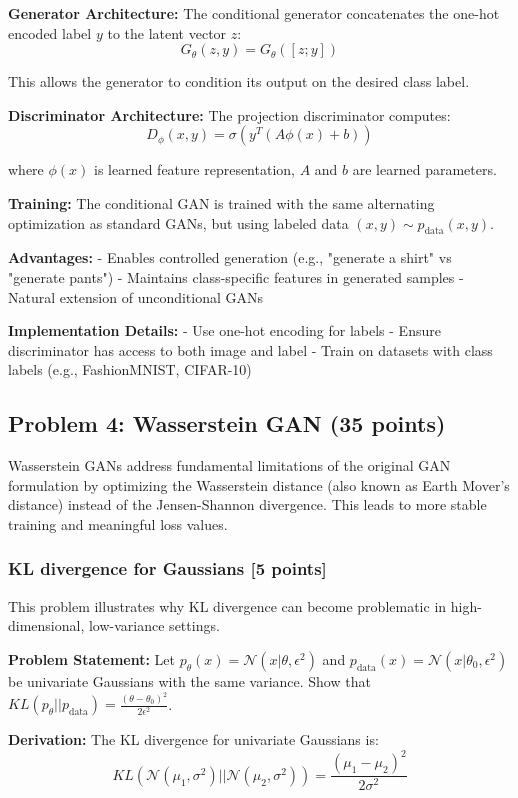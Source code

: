 \documentclass{article}
\begin{document}
\textbf{Generator Architecture:} The conditional generator concatenates the one-hot encoded label $y$ to the latent vector $z$:
\[
G_\theta(z, y) = G_\theta([z; y])
\]

This allows the generator to condition its output on the desired class label.

\textbf{Discriminator Architecture:} The projection discriminator computes:
\[
D_\phi(x, y) = \sigma(y^T (A \phi(x) + b))
\]

where $\phi(x)$ is learned feature representation, $A$ and $b$ are learned parameters.

\textbf{Training:} The conditional GAN is trained with the same alternating optimization as standard GANs, but using labeled data $(x, y) \sim p_{\text{data}}(x, y)$.

\textbf{Advantages:}
- Enables controlled generation (e.g., "generate a shirt" vs "generate pants")
- Maintains class-specific features in generated samples
- Natural extension of unconditional GANs

\textbf{Implementation Details:}
- Use one-hot encoding for labels
- Ensure discriminator has access to both image and label
- Train on datasets with class labels (e.g., FashionMNIST, CIFAR-10)

\subsection{Problem 4: Wasserstein GAN (35 points)}

Wasserstein GANs address fundamental limitations of the original GAN formulation by optimizing the Wasserstein distance (also known as Earth Mover's distance) instead of the Jensen-Shannon divergence. This leads to more stable training and meaningful loss values.

\subsubsection{KL divergence for Gaussians [5 points]}

This problem illustrates why KL divergence can become problematic in high-dimensional, low-variance settings.

\textbf{Problem Statement:} Let $p_\theta(x) = \mathcal{N}(x|\theta, \epsilon^2)$ and $p_{\text{data}}(x) = \mathcal{N}(x|\theta_0, \epsilon^2)$ be univariate Gaussians with the same variance. Show that $KL(p_\theta||p_{\text{data}}) = \frac{(\theta - \theta_0)^2}{2\epsilon^2}$.

\textbf{Derivation:} The KL divergence for univariate Gaussians is:
\[
KL(\mathcal{N}(\mu_1, \sigma^2) || \mathcal{N}(\mu_2, \sigma^2)) = \frac{(\mu_1 - \mu_2)^2}{2\sigma^2}
\]
\end{document}
